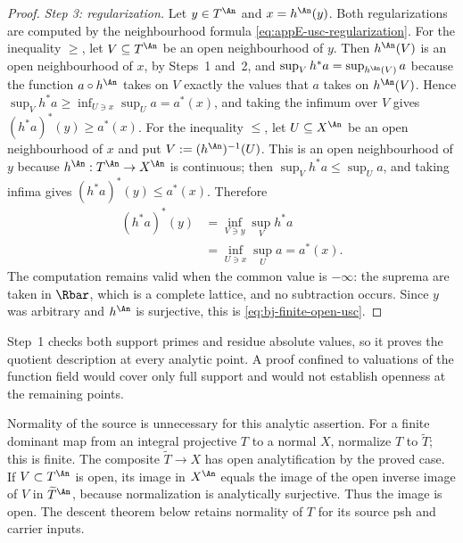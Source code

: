 \begin{proof}
\medskip
\noindent\emph{Step 3: regularization.}
Let $y\in T^{\An}$ and $x=h^{\An}(y)$.  Both regularizations are
computed by the neighbourhood formula \eqref{eq:appE-usc-regularization}.
For the inequality $\ge$, let $V\subseteq T^{\An}$ be an open
neighbourhood of $y$.  Then $h^{\An}(V)$ is an open neighbourhood of
$x$, by Steps~1 and~2, and
$\sup_V h^*a=\sup_{h^{\An}(V)}a$ because the function $a\circ h^{\An}$
takes on $V$ exactly the values that $a$ takes on $h^{\An}(V)$.
Hence $\sup_Vh^*a\ge\inf_{U\ni x}\sup_Ua=a^*(x)$, and taking the infimum
over $V$ gives $(h^*a)^*(y)\ge a^*(x)$.  For the inequality $\le$,
let $U\subseteq X^{\An}$ be an open neighbourhood of $x$ and put
$V:=(h^{\An})^{-1}(U)$.  This is an open neighbourhood of $y$ because
$h^{\An}:T^{\An}\to X^{\An}$ is continuous;
then $\sup_Vh^*a\le\sup_Ua$, and taking infima gives
$(h^*a)^*(y)\le a^*(x)$.  Therefore
\[
 \begin{aligned}
 (h^*a)^*(y)
   &=\inf_{V\ni y}\sup_Vh^*a\\
   &=\inf_{U\ni x}\sup_Ua
    =a^*(x).
 \end{aligned}
\]
The computation remains valid when the common value is $-\infty$: the
suprema are taken in $\Rbar$, which is a complete lattice, and no
subtraction occurs.  Since $y$ was arbitrary and $h^{\An}$ is
surjective, this is \eqref{eq:bj-finite-open-usc}.
\end{proof}

\begin{remark}
\label{rem:ch41-openness-scope}
Step~1 checks both support primes and residue absolute values,
so it proves the quotient description at every analytic point.
A proof confined to valuations of the function field would cover only
full support and would not establish openness at the remaining points.

Normality of the source is unnecessary for this analytic assertion.
For a finite dominant map from an integral projective $T$ to a normal
$X$, normalize $T$ to $\widetilde T$; this is finite.  The composite
$\widetilde T\to X$ has open analytification by the proved case.
If $V\subset T^{\An}$ is open, its image in $X^{\An}$ equals the
image of the open inverse image of $V$ in $\widetilde T^{\An}$,
because normalization is analytically surjective.  Thus the image is
open.  The descent theorem below retains normality of $T$ for its
source psh and carrier inputs.
\end{remark}


